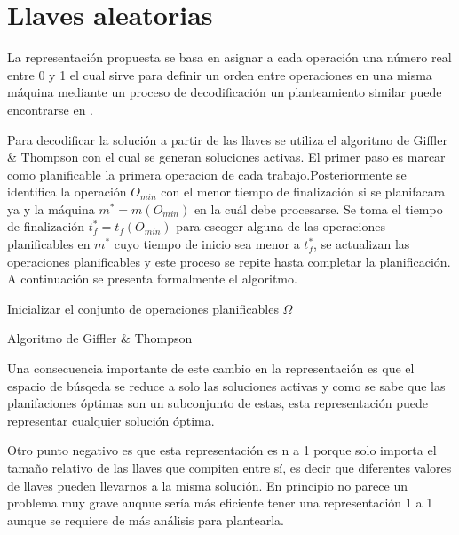\section{Llaves aleatorias}
La representación propuesta se basa en asignar a cada operación una número real entre 0 y 1 el cual sirve para definir un orden entre operaciones en una misma máquina mediante un proceso de decodificación un planteamiento similar puede encontrarse en \cite{norman1996random}.



Para decodificar la solución a partir de las llaves se utiliza el algoritmo de Giffler \& Thompson \cite{Giffler1960} con el cual se generan soluciones activas. El primer paso es marcar como planificable la primera operacion de cada trabajo.Posteriormente se identifica la operación $O_{min}$ con el menor tiempo de finalización si se planifacara ya y la máquina $m^*=m(O_{min})$ en la cuál debe procesarse. Se toma el tiempo de finalización $t^*_f = t_f(O_{min})$ para escoger alguna de las operaciones planificables en $m^*$ cuyo tiempo de inicio sea menor a $t^*_f$, se actualizan las operaciones planificables y este proceso se repite hasta completar la planificación. A continuación se presenta formalmente el algoritmo.


\begin{algorithm}[H]
 Inicializar el conjunto de operaciones planificables $\Omega$\;
    \label{alg:GT}
    \caption{Algoritmo de Giffler \& Thompson}
\end{algorithm}

Una consecuencia importante de este cambio en la representación es que el espacio de búsqeda se reduce a solo las soluciones activas y como se sabe que las planifaciones óptimas son un subconjunto de estas, esta representación puede representar cualquier solución óptima. 

Otro punto negativo es que esta representación es n a 1 porque solo importa el tamaño relativo de las llaves que compiten entre sí, es decir que diferentes valores de llaves pueden llevarnos a la misma solución. En principio no parece un problema muy grave auqnue sería más eficiente tener una representación 1 a 1 aunque se requiere de más análisis para plantearla.
